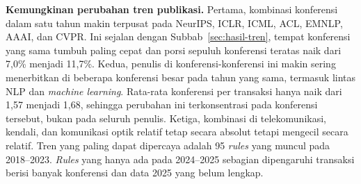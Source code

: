 \textbf{Kemungkinan perubahan tren publikasi.} Pertama, kombinasi konferensi dalam satu tahun makin terpusat pada NeurIPS, ICLR, ICML, ACL, EMNLP, AAAI, dan CVPR. Ini sejalan dengan Subbab~\ref{sec:hasil-tren}, tempat konferensi yang sama tumbuh paling cepat dan porsi sepuluh konferensi teratas naik dari 7,0\% menjadi 11,7\%. Kedua, penulis di konferensi-konferensi ini makin sering menerbitkan di beberapa konferensi besar pada tahun yang sama, termasuk lintas NLP dan \textit{machine learning}. Rata-rata konferensi per transaksi hanya naik dari 1,57 menjadi 1,68, sehingga perubahan ini terkonsentrasi pada konferensi tersebut, bukan pada seluruh penulis. Ketiga, kombinasi di telekomunikasi, kendali, dan komunikasi optik relatif tetap secara absolut tetapi mengecil secara relatif. Tren yang paling dapat dipercaya adalah 95 \textit{rules} yang muncul pada 2018--2023. \textit{Rules} yang hanya ada pada 2024--2025 sebagian dipengaruhi transaksi berisi banyak konferensi dan data 2025 yang belum lengkap.

